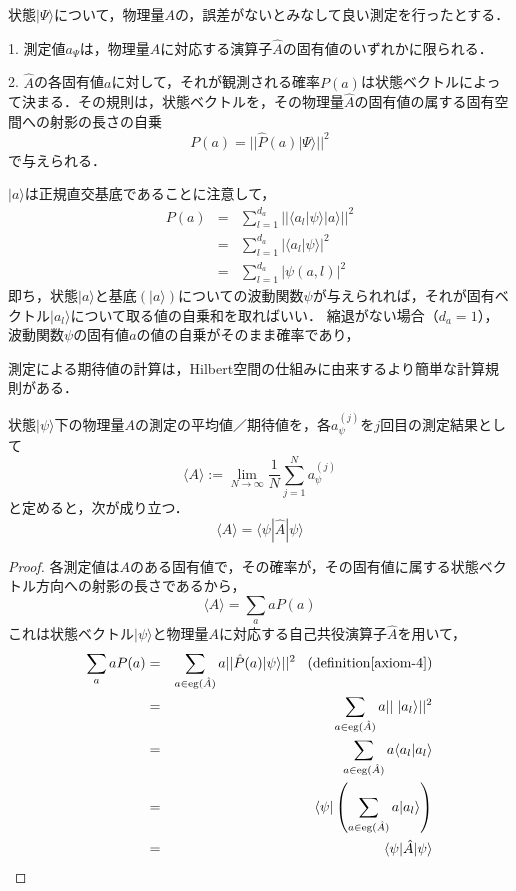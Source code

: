 \documentclass[uplatex, dvipdfmx]{jsreport}
\begin{document}
\begin{axiom}[離散固有値の場合]\label{axiom-4}
    状態$|\Psi\rangle$について，物理量$A$の，誤差がないとみなして良い測定を行ったとする．
    
    1. 測定値$a_\Psi$は，物理量$A$に対応する演算子$\hat{A}$の固有値のいずれかに限られる．

    2. $\hat{A}$の各固有値$a$に対して，それが観測される確率$P(a)$は状態ベクトルによって決まる．その規則は，状態ベクトルを，その物理量$\hat{A}$の固有値の属する固有空間への射影の長さの自乗
    \[ P(a)=||\hat{P}(a)|\Psi\rangle||^2 \]
    で与えられる．
\end{axiom}

\begin{proposition}[計算規則]
    $|a\rangle$は正規直交基底であることに注意して，
    \begin{eqnarray*}
        P(a) &=& \sum_{l=1}^{d_a}||\langle a_l|\psi\rangle |a\rangle||^2 \\
        &=& \sum_{l=1}^{d_a}|\langle a_l|\psi\rangle |^2 \\
        &=& \sum_{l=1}^{d_a}|\psi (a,l)|^2
    \end{eqnarray*}
    即ち，状態$|a\rangle$と基底$(|a\rangle)$についての波動関数$\psi$が与えられれば，それが固有ベクトル$|a_l\rangle$について取る値の自乗和を取ればいい．
    縮退がない場合（$d_a=1$），波動関数$\psi$の固有値$a$の値の自乗がそのまま確率であり，
\end{proposition}

測定による期待値の計算は，Hilbert空間の仕組みに由来するより簡単な計算規則がある．
\begin{proposition}[期待値]
    状態$|\psi\rangle$下の物理量$A$の測定の平均値／期待値を，各$a_\psi^{(j)}$を$j$回目の測定結果として
    \[ \langle A\rangle :=\lim_{N\to\infty}\frac{1}{N}\sum^N_{j=1}a_\psi^{(j)} \]
    と定めると，次が成り立つ．
    \[ \langle A\rangle = \langle\psi|\hat{A}|\psi\rangle \]
\end{proposition}
\begin{proof}
    各測定値は$A$のある固有値で，その確率が，その固有値に属する状態ベクトル方向への射影の長さであるから，
    \[ \langle A\rangle = \sum_aaP(a) \]
    これは状態ベクトル$|\psi\rangle$と物理量$A$に対応する自己共役演算子$\hat{A}$を用いて，
    \begin{eqnarray*}
        \sum_aaP(a) &=& \sum_{a\in\mathrm{eg}(\hat{A})}a||\hat{P}(a)|\psi\rangle||^2\;\;\;(\mathrm{definition}\ref{axiom-4}) \\
        &=& \sum_{a\in\mathrm{eg}(\hat{A})} a||\;|a_l\rangle||^2 \\
        &=& \sum_{a\in\mathrm{eg}(\hat{A})} a\langle a_l|a_l\rangle \\
        &=& \langle\psi |\left( \sum_{a\in\mathrm{eg}(\hat{A})}a|a_l\rangle \right) \\
        &=& \langle\psi|\hat{A}|\psi\rangle
    \end{eqnarray*}
\end{proof}
\end{document}

